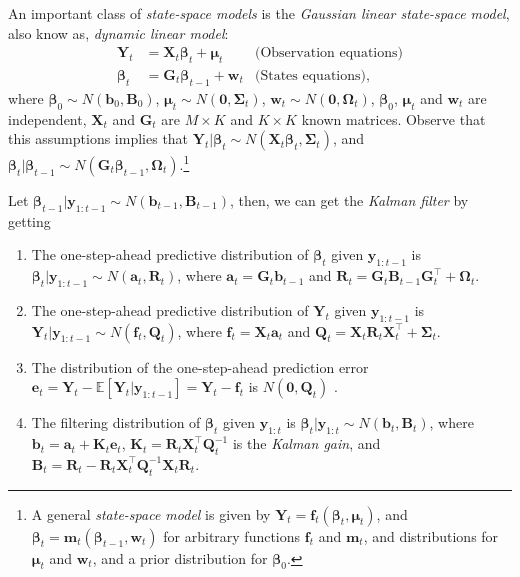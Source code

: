 An important class of \textit{state-space models} is the \textit{Gaussian linear state-space model}, also know as, \textit{dynamic linear model}:
\begin{align*}
	\bm{Y}_t&=\bm{X}_t\bm{\beta}_t+\bm{\mu}_t& \text{(Observation equations)}\\
	\bm{\beta}_t&=\bm{G}_t\bm{\beta}_{t-1}+\bm{w}_t & \text{(States equations)},
\end{align*}
where $\bm{\beta}_0\sim N(\bm{b}_0,\bm{B}_0)$, $\bm{\mu}_t\sim N(\bm{0}, \bm{\Sigma}_t)$, $\bm{w}_t\sim N(\bm{0}, \bm{\Omega}_t)$, $\bm{\beta}_0$, $\bm{\mu}_t$ and $\bm{w}_t$ are independent, $\bm{X}_t$ and $\bm{G}_t$ are $M\times K$ and $K\times K$ known matrices. Observe that this assumptions implies that $\bm{Y}_t|\bm{\beta}_t\sim N(\bm{X}_t\bm{\beta}_t,\bm{\Sigma}_t)$, and $\bm{\beta}_t|\bm{\beta}_{t-1}\sim N(\bm{G}_t\bm{\beta}_{t-1},\bm{\Omega}_t)$.\footnote{A general \textit{state-space model} is given by $\bm{Y}_t=\bm{f}_t(\bm{\beta}_t,\bm{\mu}_t)$, and $\bm{\beta}_t=\bm{m}_t(\bm{\beta}_{t-1},\bm{w}_t)$ for arbitrary functions $\bm{f}_t$ and $\bm{m}_t$, and distributions for $\bm{\mu}_t$ and $\bm{w}_t$, and a prior distribution for $\bm{\beta}_0$.}

Let $\bm{\beta}_{t-1}|\bm{y}_{1:t-1}\sim N(\bm{b}_{t-1},\bm{B}_{t-1})$, then, we can get the \textit{Kalman filter} by getting
\begin{enumerate}
	\item The one-step-ahead predictive distribution of $\bm{\beta}_t$ given $\bm{y}_{1:t-1}$ is $\bm{\beta}_t|\bm{y}_{1:t-1}\sim N(\bm{a}_t, \bm{R}_t)$, where $\bm{a}_t=\bm{G}_t\bm{b}_{t-1}$ and $\bm{R}_t=\bm{G}_t\bm{B}_{t-1}\bm{G}_t^{\top}+\bm{\Omega}_t$.
	\item  The one-step-ahead predictive distribution of $\bm{Y}_t$ given $\bm{y}_{1:t-1}$ is $\bm{Y}_t|\bm{y}_{1:t-1}\sim N(\bm{f}_t, \bm{Q}_t)$, where $\bm{f}_t=\bm{X}_t\bm{a}_t$ and $\bm{Q}_t=\bm{X}_t\bm{R}_t\bm{X}_t^{\top}+\bm{\Sigma}_t$.
	\item The distribution of the one-step-ahead prediction error  $\bm{e}_t=\bm{Y}_t-\mathbb{E}[\bm{Y}_t|\bm{y}_{1:t-1}]=\bm{Y}_t-\bm{f}_t$ is $N(\bm{0}, \bm{Q}_t)$ \cite[Chap.~6]{shumway2017time}. 
	\item The filtering distribution of $\bm{\beta}_t$ given $\bm{y}_{1:t}$ is $\bm{\beta}_t|\bm{y}_{1:t}\sim N(\bm{b}_t, \bm{B}_t)$, where $\bm{b}_t=\bm{a}_t+\bm{K}_t\bm{e}_t$, $\bm{K}_t=\bm{R}_t\bm{X}_t^{\top}\bm{Q}_t^{-1}$ is the \textit{Kalman gain}, and $\bm{B}_t=\bm{R}_t-\bm{R}_t\bm{X}_t^{\top}\bm{Q}_t^{-1}\bm{X}_t\bm{R}_t$.   
\end{enumerate}    

